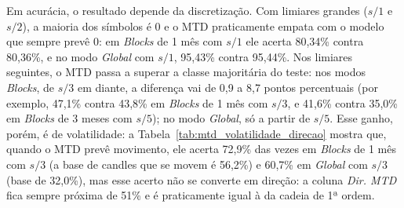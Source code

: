 \documentclass[
    12pt,                %
    openright,           %
    oneside,             %
    a4paper,             %
    english,             %
    brazil               %
]{abntex2}
\begin{document}
Em acurácia, o resultado depende da discretização. Com limiares grandes ($s/1$ e $s/2$), a maioria dos símbolos é 0 e o MTD praticamente empata com o modelo que sempre prevê 0: em \textit{Blocks} de 1 mês com $s/1$ ele acerta 80,34\% contra 80,36\%, e no modo \textit{Global} com $s/1$, 95,43\% contra 95,44\%. Nos limiares seguintes, o MTD passa a superar a classe majoritária do teste: nos modos \textit{Blocks}, de $s/3$ em diante, a diferença vai de 0,9 a 8,7 pontos percentuais (por exemplo, 47,1\% contra 43,8\% em \textit{Blocks} de 1 mês com $s/3$, e 41,6\% contra 35,0\% em \textit{Blocks} de 3 meses com $s/5$); no modo \textit{Global}, só a partir de $s/5$. Esse ganho, porém, é de volatilidade: a Tabela~\ref{tab:mtd_volatilidade_direcao} mostra que, quando o MTD prevê movimento, ele acerta 72,9\% das vezes em \textit{Blocks} de 1 mês com $s/3$ (a base de candles que se movem é 56,2\%) e 60,7\% em \textit{Global} com $s/3$ (base de 32,0\%), mas esse acerto não se converte em direção: a coluna \textit{Dir. MTD} fica sempre próxima de 51\% e é praticamente igual à da cadeia de 1ª ordem.
\end{document}

